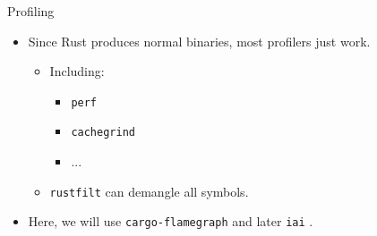 \documentclass[compress,aspectratio=169]{beamer}
\begin{document}
\begin{frame}{Profiling}
  \begin{itemize}
    \item Since Rust produces normal binaries, most profilers just work.
      \begin{itemize}
        \item Including:
          \begin{itemize}
            \item \texttt{perf} \cite{perfwiki}
            \item \texttt{cachegrind} \cite{valgrind}
            \item ...
          \end{itemize}
        \item \texttt{rustfilt} \cite{rustfilt} can demangle all symbols.
      \end{itemize}
    \item Here, we will use \texttt{cargo-flamegraph} \cite{cargoflamegraph} and later \texttt{iai} \cite{iai}.
  \end{itemize}
\end{frame}
\end{document}
